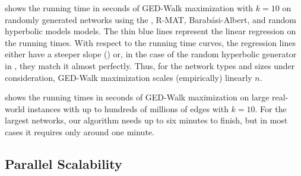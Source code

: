 \begin{table}[tb]
\centering\footnotesize
{}
\label{tab:ged-walk:time-large-insts}

\end{table}

 shows the running time in seconds of
GED-Walk maximization with $k = 10$ on randomly generated networks using the
\erdosr, R-MAT, Barab\'asi-Albert, and random hyperbolic models models.
The thin blue lines represent the linear regression on the running times.
With respect to the running time curves, the regression lines either have a
steeper slope
()
or, in the case of the random hyperbolic generator in
, they match it almost perfectly. Thus, for
the network types and sizes under consideration, GED-Walk maximization scales
(empirically) linearly \wrt $n$.

 shows the running times in seconds of
GED-Walk maximization on large real-world instances with up to hundreds of
millions of edges with $k = 10$. For the largest networks, our algorithm needs
up to six minutes to finish, but in most cases it requires only around one
minute.

\subsection{Parallel Scalability}
%

